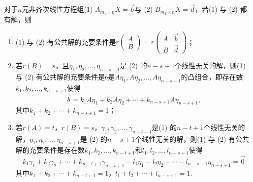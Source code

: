 \begin{theorem}\label{thm:15:非齐次线性方程组公共解}
    对于$n$元非齐次线性方程组(1) $A_{m_1 \times n}X=\vec{b}$与 (2) $B_{m_2 \times n}X=\vec{d}$，若(1) 与 (2) 都有解，则
    \begin{enumerate}
        \item (1) 与 (2) 有公共解的充要条件是$r\begin{pmatrix}
                      A \\ B
                  \end{pmatrix}=r\begin{pmatrix}
                      A & \vec{b} \\ B & \vec{d}
                  \end{pmatrix}$；

        \item 若$r(B)=s$，且$\eta_1,\eta_2,\ldots,\eta_{n-s+1}$是 (2) 的$n-s+1$个线性无关的解，则(1) 与 (2) 有公共解的充要条件是$b$是$A\eta_1,A\eta_2,\ldots,A\eta_{n-s+1}$的凸组合，即存在数$k_1,k_2,\ldots,k_{n-s+1}$使得
              \[\vec{b}=k_1A\eta_1+k_2A\eta_2+\cdots+k_{n-s+1}A\eta_{n-s+1},\]
              其中$k_1+k_2+\cdots+k_{n-s+1}=1$；

        \item 若$r(A)=t$，$r(B)=s$，$\gamma_1,\gamma_2,\ldots,\gamma_{n-t+1}$是(1) 的$n-t+1$个线性无关的解，$\eta_1,\eta_2,\ldots,\eta_{n-s+1}$是 (2) 的$n-s+1$个线性无关的解，则(1) 与 (2) 有公共解的充要条件是存在数$k_1,k_2,\ldots,k_{n-t+1}$和$l_1,l_2,\ldots,l_{n-s+1}$使得
              \[k_1\gamma_1+k_2\gamma_2+\cdots+k_{n-t+1}\gamma_{n-t+1}-l_1\eta_1-l_2\eta_2-\cdots-l_{n-s+1}\eta_{n-s+1}=\vec{0}\]
              其中$k_1+k_2+\cdots+k_{n-t+1}=1$，$l_1+l_2+\cdots+l_{n-s+1}=1$.
    \end{enumerate}
\end{theorem}

